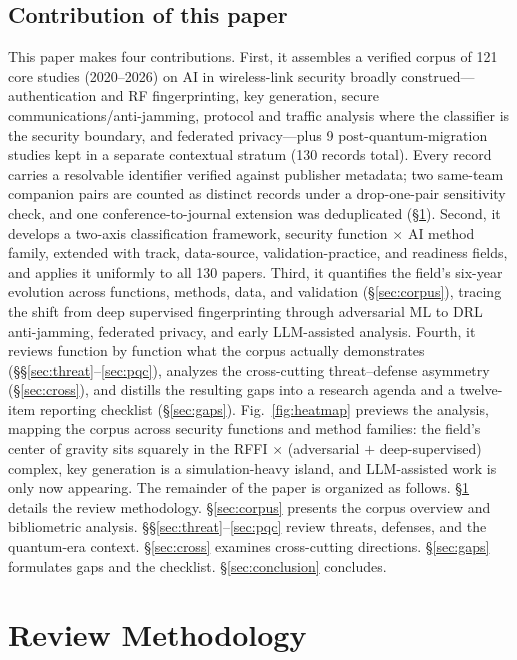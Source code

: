 \documentclass[11pt,a4paper]{article}
\begin{document}
\subsection{Contribution of this paper}
This paper makes four contributions. First, it assembles a verified corpus of 121 core studies (2020--2026) on AI in wireless-link security broadly construed---authentication and RF fingerprinting, key generation, secure communications/anti-jamming, protocol and traffic analysis where the classifier is the security boundary, and federated privacy---plus 9 post-quantum-migration studies kept in a separate contextual stratum (130 records total). Every record carries a resolvable identifier verified against publisher metadata; two same-team companion pairs are counted as distinct records under a drop-one-pair sensitivity check, and one conference-to-journal extension was deduplicated (\S\ref{sec:methods}). Second, it develops a two-axis classification framework, security function $\times$ AI method family, extended with track, data-source, validation-practice, and readiness fields, and applies it uniformly to all 130 papers. Third, it quantifies the field's six-year evolution across functions, methods, data, and validation (\S\ref{sec:corpus}), tracing the shift from deep supervised fingerprinting through adversarial ML to DRL anti-jamming, federated privacy, and early LLM-assisted analysis. Fourth, it reviews function by function what the corpus actually demonstrates (\S\S\ref{sec:threat}--\ref{sec:pqc}), analyzes the cross-cutting threat--defense asymmetry (\S\ref{sec:cross}), and distills the resulting gaps into a research agenda and a twelve-item reporting checklist (\S\ref{sec:gaps}).
Fig.~\ref{fig:heatmap} previews the analysis, mapping the corpus across security functions and method families: the field's center of gravity sits squarely in the RFFI $\times$ (adversarial $+$ deep-supervised) complex, key generation is a simulation-heavy island, and LLM-assisted work is only now appearing. The remainder of the paper is organized as follows. \S\ref{sec:methods} details the review methodology. \S\ref{sec:corpus} presents the corpus overview and bibliometric analysis. \S\S\ref{sec:threat}--\ref{sec:pqc} review threats, defenses, and the quantum-era context. \S\ref{sec:cross} examines cross-cutting directions. \S\ref{sec:gaps} formulates gaps and the checklist. \S\ref{sec:conclusion} concludes.

\section{Review Methodology}
\label{sec:methods}
\end{document}
